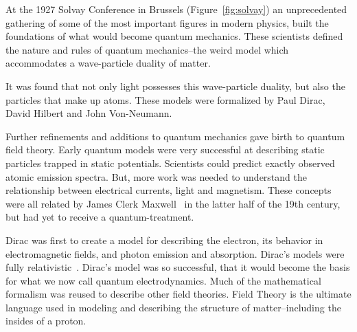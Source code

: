 At the 1927 Solvay Conference in Brussels (Figure~\ref{fig:solvay}) an
unprecedented gathering of some of the most important figures in modern physics,
built the foundations of what would become quantum mechanics. These scientists
defined the nature and rules of quantum mechanics--the weird model which
accommodates a wave-particle duality of matter. 

It was found that not only light possesses this wave-particle duality, but also
the particles that make up atoms. These models were formalized by Paul Dirac,
David Hilbert and John Von-Neumann.

Further refinements and additions to quantum mechanics gave birth to quantum
field theory. Early quantum models were very successful at describing static
particles trapped in static potentials. Scientists could predict exactly
observed atomic emission spectra. But, more work was needed to understand the
relationship between electrical currents, light and magnetism.  These concepts
were all related by James Clerk Maxwell~\cite{Maxwell1865} in the latter half of
the 19th century, but had yet to receive a quantum-treatment.

Dirac was first to create a model for describing the electron, its behavior in
electromagnetic fields, and photon emission and absorption. Dirac's models were
fully relativistic~\cite{Dirac}. Dirac's model was so successful, that it would
become the basis for what we now call quantum electrodynamics.  Much of the
mathematical formalism was reused to describe other field theories. Field Theory
is the ultimate language used in modeling and describing the structure of
matter--including the insides of a proton. 

